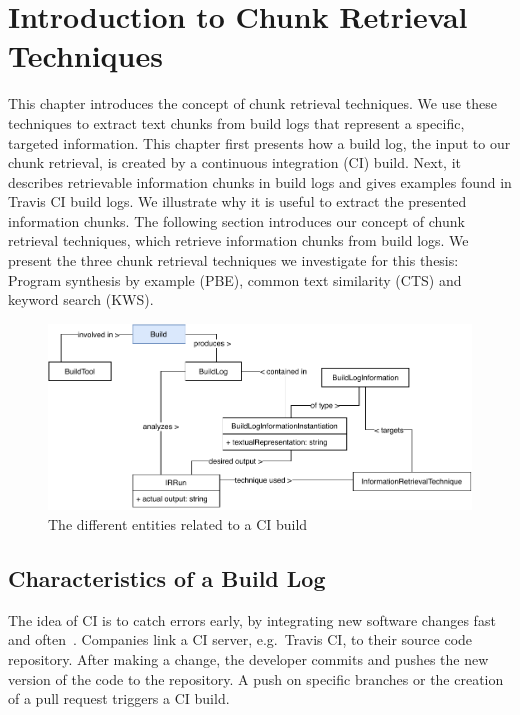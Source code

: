 \documentclass[\myrootdir/main.tex]{subfiles}
\begin{document}
\chapter{Introduction to Chunk Retrieval Techniques}
\label{sec:techniques}
This chapter introduces the concept of chunk retrieval techniques.
We use these techniques to extract text chunks from build logs that represent a specific, targeted information.
This chapter first presents how a build log, the input to our chunk retrieval, is created by a continuous integration (CI) build.
Next, it describes retrievable information chunks in build logs and gives examples found in Travis CI build logs.
We illustrate why it is useful to extract the presented information chunks.
The following section introduces our concept of chunk retrieval techniques, which retrieve information chunks from build logs.
We present the three chunk retrieval techniques we investigate for this thesis:
Program synthesis by example (PBE), common text similarity (CTS) and keyword search (KWS).

\begin{figure}[htbp]
	\centering
	\includegraphics[width=\textwidth, clip]{img/build-overview.pdf}
	\caption{The different entities related to a CI build}
	\label{fig:build-overview}
\end{figure}

\section{Characteristics of a Build Log}
\label{sec:bl-characteristics}
The idea of CI is to catch errors early, by integrating new software changes fast and often~\cite{humble2010continuous}.
Companies link a CI server, e.g.\ Travis CI, to their source code repository.
After making a change, the developer commits and pushes the new version of the code to the repository.
A push on specific branches or the creation of a pull request triggers a CI build.
\end{document}
